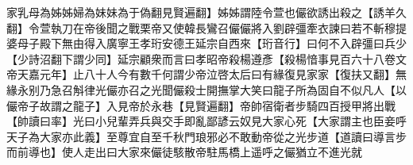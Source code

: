 家乳母為姊姊婦為妹妹為于偽翻見賢遍翻】姊姊謂陸令萱也儼欲誘出殺之【誘羊久翻】令萱執刀在帝後聞之戰栗帝又使韓長鸞召儼儼將入劉辟彊牽衣諫曰若不斬穆提婆母子殿下無由得入廣寧王孝珩安德王延宗自西來【珩音行】曰何不入辟彊曰兵少【少詩沼翻下謂少同】延宗顧衆而言曰孝昭帝殺楊遵彥【殺楊愔事見百六十八卷文帝天嘉元年】止八十人今有數千何謂少帝泣啓太后曰有緣復見家家【復扶又翻】無緣永别乃急召斛律光儼亦召之光聞儼殺士開撫掌大笑曰龍子所為固自不似凡人【以儼帝子故謂之龍子】入見帝於永巷【見賢遍翻】帝帥宿衛者步騎四百授甲將出戰【帥讀曰率】光曰小兒輩弄兵與交手即亂鄙諺云奴見大家心死【大家謂主也臣妾呼天子為大家亦此義】至尊宜自至千秋門琅邪必不敢動帝從之光步道【道讀曰導言步而前導也】使人走出曰大家來儼徒駭散帝駐馬橋上遥呼之儼猶立不進光就